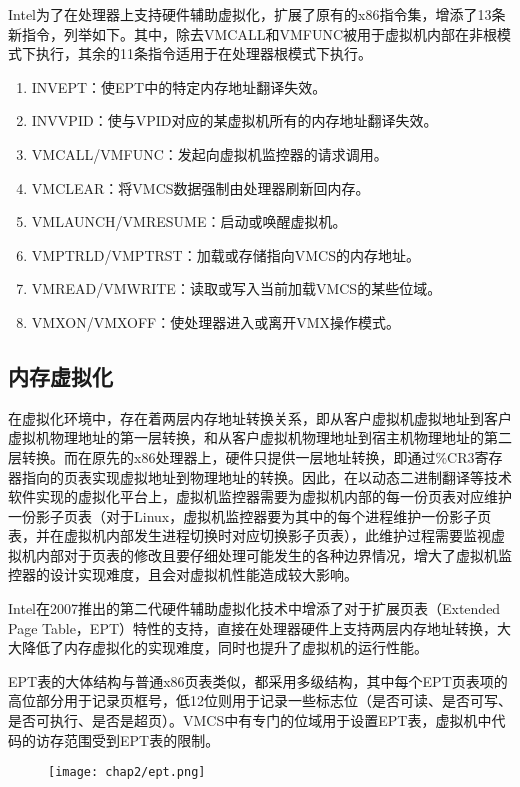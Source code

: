 Intel为了在处理器上支持硬件辅助虚拟化，扩展了原有的x86指令集，增添了13条新指令，列举如下。其中，除去VMCALL和VMFUNC被用于虚拟机内部在非根模式下执行，其余的11条指令适用于在处理器根模式下执行。

\begin{enumerate}
\item INVEPT：使EPT中的特定内存地址翻译失效。
\item INVVPID：使与VPID对应的某虚拟机所有的内存地址翻译失效。
\item VMCALL/VMFUNC：发起向虚拟机监控器的请求调用。
\item VMCLEAR：将VMCS数据强制由处理器刷新回内存。
\item VMLAUNCH/VMRESUME：启动或唤醒虚拟机。
\item VMPTRLD/VMPTRST：加载或存储指向VMCS的内存地址。
\item VMREAD/VMWRITE：读取或写入当前加载VMCS的某些位域。
\item VMXON/VMXOFF：使处理器进入或离开VMX操作模式。
\end{enumerate}

\subsection{内存虚拟化}

在虚拟化环境中，存在着两层内存地址转换关系，即从客户虚拟机虚拟地址到客户虚拟机物理地址的第一层转换，和从客户虚拟机物理地址到宿主机物理地址的第二层转换。而在原先的x86处理器上，硬件只提供一层地址转换，即通过\%CR3寄存器指向的页表实现虚拟地址到物理地址的转换。因此，在以动态二进制翻译等技术软件实现的虚拟化平台上，虚拟机监控器需要为虚拟机内部的每一份页表对应维护一份影子页表（对于Linux，虚拟机监控器要为其中的每个进程维护一份影子页表，并在虚拟机内部发生进程切换时对应切换影子页表），此维护过程需要监视虚拟机内部对于页表的修改且要仔细处理可能发生的各种边界情况，增大了虚拟机监控器的设计实现难度，且会对虚拟机性能造成较大影响。

Intel在2007推出的第二代硬件辅助虚拟化技术中增添了对于扩展页表（Extended Page Table，EPT）特性的支持，直接在处理器硬件上支持两层内存地址转换，大大降低了内存虚拟化的实现难度，同时也提升了虚拟机的运行性能。

EPT表的大体结构与普通x86页表类似，都采用多级结构，其中每个EPT页表项的高位部分用于记录页框号，低12位则用于记录一些标志位（是否可读、是否可写、是否可执行、是否是超页）。VMCS中有专门的位域用于设置EPT表，虚拟机中代码的访存范围受到EPT表的限制。

\begin{figure}[!htp]
  \centering
  \texttt{[image: chap2/ept.png]}
\end{figure}

